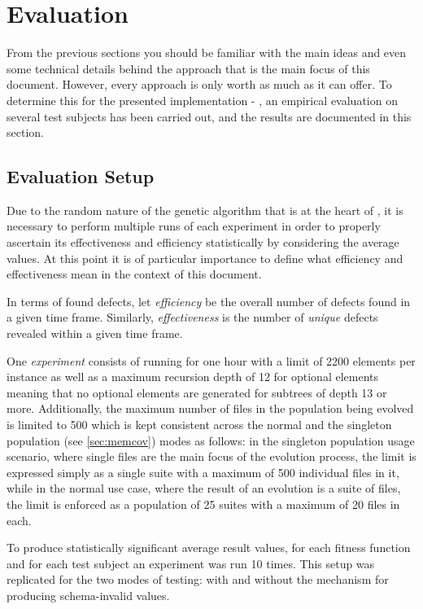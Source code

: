 \section{Evaluation}
\label{sec:evaluation}
From the previous sections you should be familiar with the main ideas and even some technical details behind
the approach that is the main focus of this document. However, every approach is only worth as much as it can
offer. To determine this for the presented implementation - \xmlmate, an empirical evaluation on several test
subjects has been carried out, and the results are documented in this section.
\subsection{Evaluation Setup}

Due to the random nature of the genetic algorithm that is at the heart of \xmlmate, it is necessary to perform
multiple runs of each experiment in order to properly ascertain its effectiveness and efficiency statistically
by considering the average values. At this point it is of particular importance to define what efficiency and
effectiveness mean in the context of this document. 

In terms of found defects, let \emph{efficiency} be the overall number of defects found in a given time frame.
Similarly, \emph{effectiveness} is the number of \emph{unique} defects revealed within a given time frame.

One \emph{experiment} consists of running \xmlmate for one hour with a limit of 2200 elements per \xml instance
as well as a maximum recursion depth of 12 for optional elements meaning that no optional elements are generated
for subtrees of depth 13 or more. Additionally, the maximum number of \xml files in the population being
evolved is limited to 500 which is kept consistent across the normal and the singleton population (see
\cref{sec:memcov}) modes as follows: in the singleton population usage scenario, where single files are the
main focus of the evolution process, the limit is expressed simply as a single suite with a maximum of 500
individual files in it, while in the normal use case, where the result of an evolution is a suite of files, the
limit is enforced as a population of 25 suites with a maximum of 20 files in each.

To produce statistically significant average result values, for each fitness function and for each test
subject an experiment was run 10 times. This setup was replicated for the two modes of testing: with and
without the mechanism for producing schema-invalid values.

